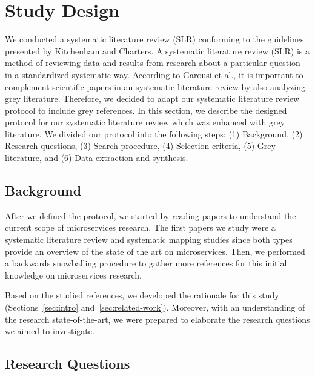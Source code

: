 
\section{Study Design}\label{sec:study-design}

We conducted a systematic literature review (SLR) conforming to the guidelines presented by Kitchenham and Charters.\cite{Kitchenham2007} A systematic literature review (SLR) is a method of reviewing data and results from research about a particular question in a standardized systematic way.\cite{Sebastian2018} According to Garousi et al.,\cite{Garousi2016} it is important to complement scientific papers in an systematic literature review by also analyzing grey literature. Therefore, we decided to adapt our systematic literature review protocol to include grey references.
%
In this section, we describe the designed protocol for our systematic literature review which was enhanced with grey literature. We divided our protocol into the following steps: (1) Background, (2) Research questions, (3) Search procedure, (4) Selection criteria, (5) Grey literature, and (6) Data extraction and synthesis.

\subsection{Background}

After we defined the protocol, we started by reading papers to understand the current scope of microservices research. 
%
The first papers we study were a systematic literature review\cite{Ghani2019} and systematic mapping studies\cite{ Francesco2019, Claus2016} since both types provide an overview of the state of the art on microservices. Then, we performed a backwards snowballing procedure to gather more references for this initial knowledge on microservices research.\cite{Larrucea2018, Soldani2018, Dragoni2017, Olaf2016, Kevin2015, Meshenberg2016, Osses2019, ghofrani2018, Shady2020, Michael2018, Toledo2019, Matt2016}

Based on the studied references, we developed the rationale for this study (Sections~\ref{sec:intro} and~\ref{sec:related-work}). Moreover, with an understanding of the research state-of-the-art, we were prepared to elaborate the research questions we aimed to investigate. 

\subsection{Research Questions}

